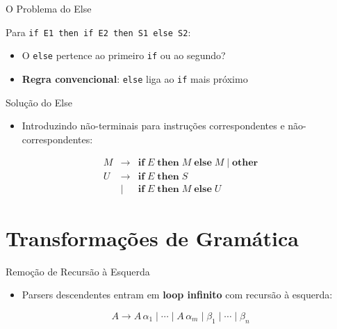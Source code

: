 \begin{frame}[fragile]{O Problema do Else}

    Para \texttt{if E1 then if E2 then S1 else S2}:

    \begin{itemize}

        \item
        O \texttt{else} pertence ao primeiro
        \texttt{if} ou ao segundo?
        \item
        \textbf{Regra convencional}: \texttt{else} liga ao
        \texttt{if} mais próximo
    \end{itemize}
\end{frame}

\begin{frame}{Solução do Else}

    \begin{itemize}

        \item
        Introduzindo não-terminais para instruções correspondentes e
        não-correspondentes:
    \end{itemize}

    \[\begin{array}{lcl}
    M &\to& \mathbf{if}\; E\; \mathbf{then}\; M\; \mathbf{else}\; M \mid \mathbf{other}\\
    U &\to& \mathbf{if}\; E\; \mathbf{then}\; S \\
    &\mid& \mathbf{if}\; E\; \mathbf{then}\; M\; \mathbf{else}\; U
\end{array}\]
\end{frame}


\section{Transformações de
Gramática}\label{transformauxe7uxf5es-de-gramuxe1tica}

\begin{frame}{Remoção de Recursão à Esquerda}

    \begin{itemize}

        \item
        Parsers descendentes entram em \textbf{loop infinito} com recursão à
        esquerda:
    \end{itemize}

    \[A \to A\,\alpha_1 \mid \cdots \mid A\,\alpha_m \mid \beta_1 \mid \cdots \mid \beta_n\]
\end{frame}

